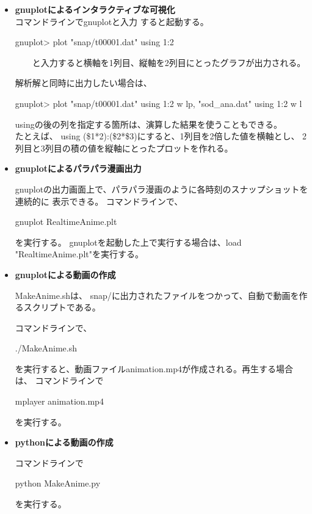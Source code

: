 \begin{itemize}
    \item  {\bf {\ttfamily gnuplot}によるインタラクティブな可視化} \\
    コマンドラインで{\ttfamily gnuplot}と入力
    すると起動する。

    \begin{screen}
    {\ttfamily gnuplot> plot "snap/t00001.dat" using 1:2}
    \end{screen}
　　と入力すると横軸を1列目、縦軸を2列目にとったグラフが出力される。

    解析解と同時に出力したい場合は、
    \begin{screen}
    \small
    {\ttfamily gnuplot> plot "snap/t00001.dat" using 1:2 w lp, "sod\_ana.dat" using 1:2 w l}
    \end{screen}

    {\ttfamily using}の後の列を指定する箇所は、演算した結果を使うこともできる。\\
    たとえば、
    {\ttfamily using (\$1*2):(\$2*\$3)}にすると、1列目を2倍した値を横軸とし、
    2列目と3列目の積の値を縦軸にとったプロットを作れる。


    \item {\bf {\ttfamily gnuplot}によるパラパラ漫画出力}

    {\ttfamily gnuplot}の出力画面上で、パラパラ漫画のように各時刻のスナップショットを連続的に
    表示できる。
    コマンドラインで、
    \begin{screen}
    \small
    {\ttfamily gnuplot RealtimeAnime.plt}
    \end{screen}
    を実行する。
    {\ttfamily gnuplot}を起動した上で実行する場合は、{\ttfamily load "RealtimeAnime.plt"}を実行する。
    
    \item {\bf {\ttfamily gnuplot}による動画の作成}

    {\ttfamily MakeAnime.sh}は、
    {\ttfamily snap/}に出力されたファイルをつかって、自動で動画を作るスクリプトである。

    コマンドラインで、
    \begin{screen}
    \small
    {\ttfamily ./MakeAnime.sh}
    \end{screen}
    を実行すると、動画ファイル{\ttfamily animation.mp4}が作成される。再生する場合は、
    コマンドラインで
    \begin{screen}
    \small
    {\ttfamily mplayer animation.mp4}
    \end{screen}
    を実行する。
    
    
    \item {\bf {\ttfamily python}による動画の作成}

    コマンドラインで
    \begin{screen}
    \small
    {\ttfamily python MakeAnime.py}
    \end{screen}
    を実行する。
    
\end{itemize}


